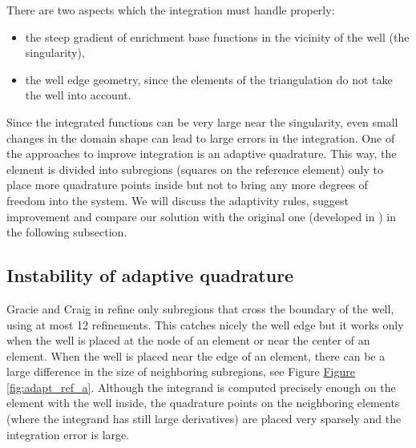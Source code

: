 \documentclass{elsarticle}
\newcommand{\fig}[1]{\hyperref[#1]{Figure \ref{#1}}}
\begin{document}
There are two aspects which the integration must handle properly:
\begin{itemize}
  \item the steep gradient of enrichment base functions in the vicinity of the well (the singularity),
  \item the well edge geometry, since the elements of the triangulation do not take the well into account.
\end{itemize}

Since the integrated functions can be very large near the singularity, even small changes in the domain shape 
can lead to large errors in the integration.
One of the approaches to improve integration is an adaptive quadrature. This way, the element is divided into 
subregions (squares on the reference element) only to place more quadrature points inside but not to bring 
any more degrees of freedom into the system. We will discuss the adaptivity rules, suggest improvement and 
compare our solution with the original one (developed in \cite{gracie_modelling_2010}) in the following subsection. 

\subsection{Instability of adaptive quadrature}
\label{sec:refinement_element}
Gracie and Craig in \cite{gracie_modelling_2010} refine only subregions that cross the boundary of the well, using at most 12 refinements.
This catches nicely the well edge but it works only when the well is placed at the node of an element or near the center of an element. 
When the well is placed near the edge of an element, there can be
a large difference in the size of neighboring subregions, see Figure \fig{fig:adapt_ref_a}. Although
the integrand is computed precisely enough on the element with the well inside, the quadrature points on the
neighboring elements (where the integrand has still large derivatives) are placed very sparsely 
and the integration error is large.
\end{document}
